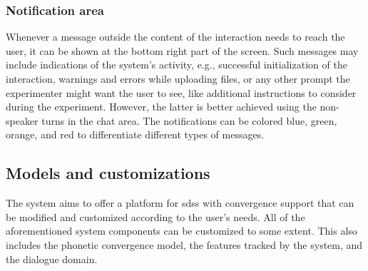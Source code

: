 \subsubsection{Notification area}
\label{subsubsec:notification_area}

Whenever a message outside the content of the interaction needs to reach the user, it can be shown at the bottom right part of the screen.
Such messages may include indications of the system's activity, e.g., successful initialization of the interaction, warnings and errors while uploading files, or any other prompt the experimenter might want the user to see, like additional instructions to consider during the experiment.
However, the latter is better achieved using the non-speaker turns in the chat area.
The notifications can be colored blue, green, orange, and red to differentiate different types of messages.

%

\subsection{Models and customizations}
\label{subsec:models_and_cusomizations}

The system aims to offer a platform for \acp{sds} with convergence support that can be modified and customized according to the user's needs.
All of the aforementioned system components can be customized to some extent.
This also includes the phonetic convergence model, the features tracked by the system, and the dialogue domain.

